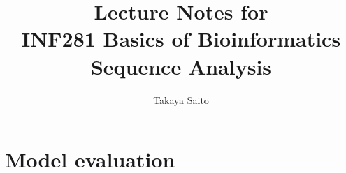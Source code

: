 \documentclass[12pt]{article}
\title{Lecture Notes for \\ INF281 Basics of Bioinformatics Sequence Analysis}
\author{Takaya Saito}
\date{}
\begin{document}
\setcounter{page}{54}

\makeatletter 
\renewcommand{\thefigure}{\arabic{section}.\arabic{figure}}
\renewcommand{\thetable}{\arabic{section}.\arabic{table}}
\makeatother

%
%
\setcounter{section}{6}
\setcounter{figure}{0}
\setcounter{table}{0}
\section{Model evaluation}


\newpage


\end{document}
